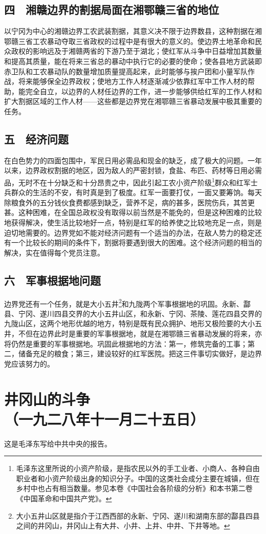 \documentclass[cn,11pt,chinese]{elegantbook}
\def\myformat#1{\hfil\hfil #1}
\begin{document}
\subsection*{\myformat{四　湘赣边界的割据局面在湘鄂赣三省的地位}}
以宁冈为中心的湘赣边界工农武装割据，其意义决不限于边界数县，这种割据在湘鄂赣三省工农暴动夺取三省政权的过程中是有很大的意义的。使边界土地革命和民众政权的影响远及于湘赣两省的下游乃至于湖北；使红军从斗争中日益增加其数量和提高其质量，能在将来三省总的暴动中执行它的必要的使命；使各县地方武装即赤卫队和工农暴动队的数量增加质量提高起来，此时能够与挨户团和小量军队作战，将来能够保全边界政权；使地方工作人材逐渐减少依靠红军中工作人材的帮助，能完全自立，以边界的人材任边界的工作，进一步能够供给红军的工作人材和扩大割据区域的工作人材——这些都是边界党在湘鄂赣三省暴动发展中极其重要的任务。\\
\subsection*{\myformat{五　经济问题}}
在白色势力的四面包围中，军民日用必需品和现金的缺乏，成了极大的问题。一年以来，边界政权割据的地区，因为敌人的严密封锁，食盐、布匹、药材等日用必需品，无时不在十分缺乏和十分昂贵之中，因此引起工农小资产阶级\footnote[13]{ 毛泽东这里所说的小资产阶级，是指农民以外的手工业者、小商人、各种自由职业者和小资产阶级出身的知识分子。中国的这类社会成分主要在城镇，但在乡村中也占有相当数量。参见本卷《中国社会各阶级的分析》和本书第二卷《中国革命和中国共产党》。}群众和红军士兵群众的生活的不安，有时真是到了极度。红军一面要打仗，一面又要筹饷。每天除粮食外的五分钱伙食费都感到缺乏，营养不足，病的甚多，医院伤兵，其苦更甚。这种困难，在全国总政权没有取得以前当然是不能免的，但是这种困难的比较地获得解决，使生活比较地好一点，特别是红军的给养使之比较地充足一点，则是迫切地需要的。边界党如不能对经济问题有一个适当的办法，在敌人势力的稳定还有一个比较长的期间的条件下，割据将要遇到很大的困难。这个经济问题的相当的解决，实在值得每个党员注意。\\
\subsection*{\myformat{六　军事根据地问题}}
边界党还有一个任务，就是大小五井\footnote[14]{ 大小五井山区就是指介于江西西部的永新、宁冈、遂川和湖南东部的酃县四县之间的井冈山，井冈山上有大井、小井、上井、中井、下井等地。}和九陇两个军事根据地的巩固。永新、酃县、宁冈、遂川四县交界的大小五井山区，和永新、宁冈、茶陵、莲花四县交界的九陇山区，这两个地形优越的地方，特别是既有民众拥护、地形又极险要的大小五井，不但在边界此时是重要的军事根据地，就是在湘鄂赣三省暴动发展的将来，亦将仍然是重要的军事根据地。巩固此根据地的方法：第一，修筑完备的工事；第二，储备充足的粮食；第三，建设较好的红军医院。把这三件事切实做好，是边界党应该努力的。\\
\newpage\section*{\myformat{井冈山的斗争}\\\myformat{（一九二八年十一月二十五日）}}
\begin{introduction}\item  这是毛泽东写给中共中央的报告。\end{introduction}
\end{document}
